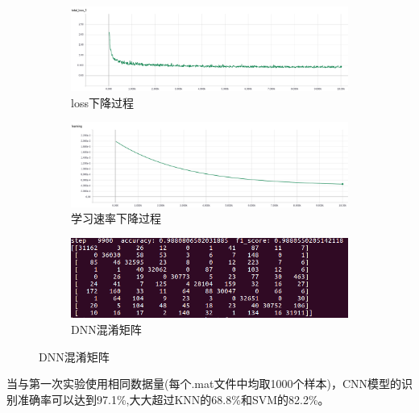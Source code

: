 \documentclass[a4paper]{article}
\begin{document}
        \begin{figure}[htbp]
            \centering
            \begin{subfigure}[b]{0.48\textwidth}
                \includegraphics[width=\textwidth]{./images/total_loss_dnn.png}
                \caption{loss下降过程}
            \end{subfigure}
            \begin{subfigure}[b]{0.48\textwidth}
                \includegraphics[width=\textwidth]{./images/learning_rate_dnn.png}
                \caption{学习速率下降过程}
            \end{subfigure}

            \begin{subfigure}[b]{0.6\textwidth}
                \includegraphics[width=\textwidth]{./images/confusion_matrix_dnn.png}
                \caption{DNN混淆矩阵}
            \end{subfigure}
            
            \label{fig:confusion_matrix}
        \end{figure}

        当与第一次实验使用相同数据量(每个.mat文件中均取1000个样本)，CNN模型的识别准确率可以达到97.1\%,大大超过KNN的68.8\%和SVM的82.2\%。
\end{document}
